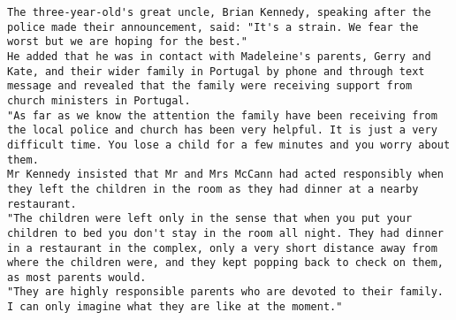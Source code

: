 \begin{lstlisting}
The three-year-old's great uncle, Brian Kennedy, speaking after the police made their announcement, said: "It's a strain. We fear the worst but we are hoping for the best." 
He added that he was in contact with Madeleine's parents, Gerry and Kate, and their wider family in Portugal by phone and through text message and revealed that the family were receiving support from church ministers in Portugal. 
"As far as we know the attention the family have been receiving from the local police and church has been very helpful. It is just a very difficult time. You lose a child for a few minutes and you worry about them. 
Mr Kennedy insisted that Mr and Mrs McCann had acted responsibly when they left the children in the room as they had dinner at a nearby restaurant. 
"The children were left only in the sense that when you put your children to bed you don't stay in the room all night. They had dinner in a restaurant in the complex, only a very short distance away from where the children were, and they kept popping back to check on them, as most parents would. 
"They are highly responsible parents who are devoted to their family. I can only imagine what they are like at the moment." 
\end{lstlisting}

